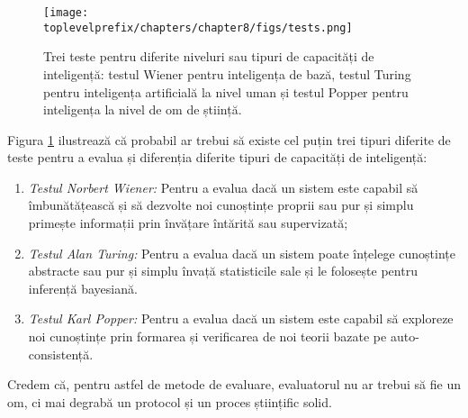 \documentclass[../../book-main_ro.tex]{subfiles}
\begin{document}
\begin{figure}[t]
    \centering
    \texttt{[image: \\toplevelprefix/chapters/chapter8/figs/tests.png]}
    \caption{Trei teste pentru diferite niveluri sau tipuri de capacități de inteligență: testul Wiener pentru inteligența de bază, testul Turing pentru inteligența artificială la nivel uman și testul Popper pentru inteligența la nivel de om de știință.}
    \label{fig:three-tests}
\end{figure}

Figura \ref{fig:three-tests} ilustrează că probabil ar trebui să existe cel puțin trei tipuri diferite de teste pentru a evalua și diferenția diferite tipuri de capacități de inteligență:
\begin{enumerate}
    \item {\em Testul Norbert Wiener:} Pentru a evalua dacă un sistem este capabil să îmbunătățească și să dezvolte noi cunoștințe proprii sau pur și simplu primește informații prin învățare întărită sau supervizată;
    \item {\em Testul Alan Turing:} Pentru a evalua dacă un sistem poate înțelege cunoștințe abstracte sau pur și simplu învață statisticile sale și le folosește pentru inferență bayesiană.
    \item {\em Testul Karl Popper:} Pentru a evalua dacă un sistem este capabil să exploreze noi cunoștințe prin formarea și verificarea de noi teorii bazate pe auto-consistență.
\end{enumerate}
Credem că, pentru astfel de metode de evaluare, evaluatorul nu ar trebui să fie un om, ci mai degrabă un protocol și un proces științific solid.
\end{document}
